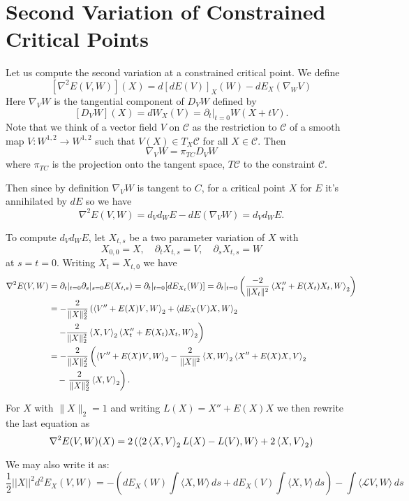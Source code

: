\documentclass[12pt]{article}
\begin{document}
\section{Second Variation of Constrained Critical Points}

Let us compute the second variation at a constrained critical point. We define
\[
[\nabla^2 E(V, W)] (X) = d[dE(V)]_X (W) - dE_X(\nabla_W V)
\]
Here \(\nabla_V W\) is the tangential component of \(D_V W\) defined by
\[
[D_V W] (X) = dW_X(V) = \partial_t|_{t=0} W(X + t V).
\]
Note that we think of a vector field \(V\) on \(\mathcal{C}\) as the restriction to \(\mathcal{C}\) of a smooth map \(V : W^{1,2} \to W^{1,2}\) such that \(V(X) \in T_X \mathcal{C}\) for all \(X \in \mathcal{C}\). Then
\[
\nabla_V W = \pi_{TC} D_V W
\]
where \(\pi_{TC}\) is the projection onto the tangent space, \(T\mathcal{C}\) to the constraint \(\mathcal{C}\).

Then since by definition \(\nabla_V W\) is tangent to \(C\), for a critical point \(X\) for \(E\) it's annihilated by \(dE\) so we have
\[
\nabla^2 E(V, W) = d_V d_W E - dE(\nabla_V W) = d_V d_W E.
\]

To compute \(d_V d_W E\), let \(X_{t,s}\) be a two parameter variation of \(X\) with
\[
X_{0,0} = X, \quad \partial_t X_{t,s} = V, \quad \partial_s X_{t,s} = W
\]
at \(s = t = 0\). Writing \(X_t = X_{t, 0}\) we have
\[
\begin{split}
\nabla^2 E(V, W) &= \partial_t|_{t=0} \partial_s|_{s=0} E(X_{t,s}) = \partial_t|_{t=0} [dE_{X_t} (W)] = \partial_t|_{t=0} \left(\frac{-2}{\|X_t\|^2} \left\langle{X_t'' + E(X_t) X_t},{W}\right\rangle_2\right) \\
&= -\frac{2}{\|X\|_2^2} \left(\left\langle{V'' + E(X) V},{W}\right\rangle_2 + \left\langle{dE_X (V)X},{W}\right\rangle_2 \right. \\
&\quad \left. - \frac{2}{\|X\|_2^2} \left\langle{X},{V}\right\rangle_2 \left\langle{X_t'' + E(X_t) X_t},{W}\right\rangle_2 \right) \\
&= -\frac{2}{\|X\|_2^2} \left(\left\langle{V'' + E(X) V},{W}\right\rangle_2 - \frac{2}{\|X\|^2} \left\langle{X},{W}\right\rangle_2 \left\langle{X'' + E(X) X},{V}\right\rangle_2 \right. \\
&\quad - \left. \frac{2}{\|X\|_2^2} \left\langle{X},{V}\right\rangle_2 \right).
\end{split}
\]

For \(X\) with \(\|X\|_2 = 1\) and writing \(L(X) = X'' + E(X) X\) we then rewrite the last equation as
\[
\nabla^2 E(V, W) (X) = 2\left(\left\langle{2\ensuremath{\left\langle{X},{V}\right\rangle}_2 L(X) - L(V)},{W}\right\rangle + 2\left\langle{X},{V}\right\rangle_2\right)
\]

We may also write it as:
\[
\frac12    ||X||^2    d^2 E_X(V,W)
= - \left( dE_X(W)\int \langle X,W \rangle \,ds + dE_X(V)\int \langle X,V \rangle \,ds \right)
-  \int \langle \mathcal{L} V, W \rangle  \,ds
\]
\end{document}
